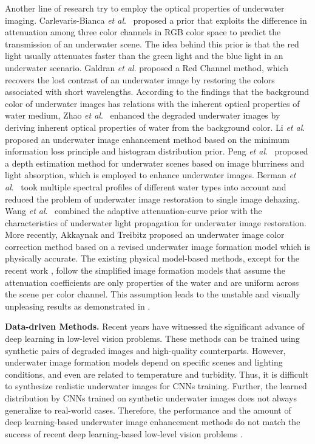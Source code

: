 \documentclass[journal]{IEEEtran}
\newcommand{\etal}{\textit{et al}.}
\begin{document}
Another line of research try to employ the optical properties of underwater imaging.
Carlevaris-Bianca \etal~\cite{Carlevaris2010} proposed a prior that exploits the difference in attenuation among three color channels in RGB color space to predict the transmission of an underwater scene. The idea behind this prior is that the red light usually attenuates faster than the green light and the blue light in an underwater scenario.
Galdran \etal \cite{Galdran2015} proposed a Red Channel method, which recovers the lost contrast of an underwater image by restoring the colors associated with short wavelengths.
According to the findings that the background color of underwater images has relations with the inherent optical properties of water medium, Zhao \etal~\cite{Zhao2015} enhanced the degraded underwater images by deriving inherent optical properties of water from the background color.
Li \etal~\cite{Li2016ICIP,Li2016} proposed an underwater image enhancement method based on the minimum information loss principle and histogram distribution prior.
Peng \etal~\cite{Peng2017} proposed a depth estimation method for underwater scenes based on image blurriness and light absorption, which is employed to enhance underwater images.
Berman \etal~\cite{Dana2017} took multiple spectral profiles of different water types into account and reduced the problem of underwater image restoration to single image dehazing.
Wang \etal~\cite{Wang2018} combined the adaptive attenuation-curve prior with the characteristics of underwater light propagation for underwater image restoration.
More recently, Akkaynak and Treibitz \cite{Akkaynak2019} proposed an underwater image color correction method based on a revised underwater image formation model \cite{Akkaynak2017} which is physically accurate. The existing physical model-based methods, except for the recent work \cite{Akkaynak2019}, follow the simplified image formation models that assume the attenuation coefficients are only properties of the water and are uniform across the scene per color channel. This assumption leads to the unstable and visually unpleasing results as demonstrated in \cite{Akkaynak2017,Akkaynak2019}.


\noindent
\textbf{Data-driven Methods.} Recent years have witnessed the significant advance of deep learning in low-level vision problems. These methods can be trained using synthetic pairs of degraded images and high-quality counterparts.  However, underwater image formation models depend on specific scenes and lighting conditions, and even are related to temperature and turbidity. Thus, it is difficult to synthesize realistic underwater images for CNNs training. Further, the learned distribution by CNNs trained on synthetic underwater images does not always generalize to real-world cases. Therefore, the performance and the amount of deep learning-based underwater image enhancement methods do not match the success of recent deep learning-based low-level vision problems \cite{Survey2019}.
\end{document}
